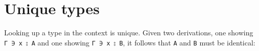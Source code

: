\hypertarget{unique-types}{%
\section{Unique types}\label{unique-types}}

Looking up a type in the context is unique. Given two derivations, one
showing \texttt{Γ\ ∋\ x\ ⦂\ A} and one showing \texttt{Γ\ ∋\ x\ ⦂\ B},
it follows that \texttt{A} and \texttt{B} must be identical:

\begin{fence}
\begin{code}%
\>[0]\AgdaSpace{}%
\AgdaSymbol{:}\AgdaSpace{}%
\AgdaSpace{}%
\AgdaSymbol{\{}\AgdaSpace{}%
\AgdaSpace{}%
\AgdaSpace{}%
\AgdaSymbol{\}}\AgdaSpace{}%
\AgdaSpace{}%
\AgdaSpace{}%
\AgdaSpace{}%
\AgdaSpace{}%
\AgdaSpace{}%
\AgdaSpace{}%
\AgdaSpace{}%
\AgdaSpace{}%
\AgdaSpace{}%
\AgdaSpace{}%
\AgdaSpace{}%
\AgdaSpace{}%
\AgdaSpace{}%
\AgdaSpace{}%
\AgdaSpace{}%
\<%
\\
\>[0]\AgdaSpace{}%
\AgdaSpace{}%
%
\>[27]\AgdaSymbol{=}%
\>[30]\<%
\\
\>[0]\AgdaSpace{}%
\AgdaSpace{}%
\AgdaSymbol{(}\AgdaSpace{}%
\AgdaSpace{}%
\AgdaSymbol{\AgdaUnderscore{})}%
\>[27]\AgdaSymbol{=}%
\>[30]\AgdaSpace{}%
\AgdaSymbol{(}\AgdaSpace{}%
\AgdaSymbol{)}\<%
\\
\>[0]\AgdaSpace{}%
\AgdaSymbol{(}\AgdaSpace{}%
\AgdaSpace{}%
\AgdaSymbol{\AgdaUnderscore{})}\AgdaSpace{}%
%
\>[27]\AgdaSymbol{=}%
\>[30]\AgdaSpace{}%
\AgdaSymbol{(}\AgdaSpace{}%
\AgdaSymbol{)}\<%
\\
\>[0]\AgdaSpace{}%
\AgdaSymbol{(}\AgdaSpace{}%
\AgdaSymbol{\AgdaUnderscore{}}\AgdaSpace{}%
\AgdaSymbol{)}\AgdaSpace{}%
\AgdaSymbol{(}\AgdaSpace{}%
\AgdaSymbol{\AgdaUnderscore{}}\AgdaSpace{}%
\AgdaSymbol{)}%
\>[27]\AgdaSymbol{=}%
\>[30]\AgdaSpace{}%
\AgdaSpace{}%
\<%
\end{code}
\end{fence}

